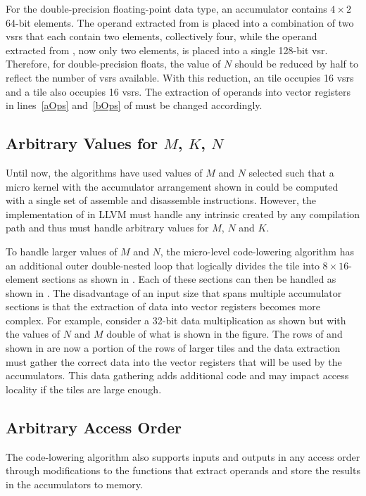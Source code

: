 \documentclass[\main/thesis.tex]{subfiles}
\begin{document}
For the double-precision floating-point data type, an accumulator contains $4 \times 2$ 64-bit elements.
The operand extracted from  is placed into a combination of two \glspl{vsr} that each contain two elements, collectively four, while the operand extracted from , now only two elements, is placed into a single 128-bit \gls{vsr}.
Therefore, for double-precision floats, the value of $N$ should be reduced by half to reflect the number of \glspl{vsr} available.
With this reduction, an  tile occupies 16 \glspl{vsr} and a  tile also occupies 16 \glspl{vsr}.
The extraction of operands into vector registers in lines~\ref{aOps} and~\ref{bOps} of  must be changed accordingly.

\subsection{Arbitrary Values for \texorpdfstring{$M$}{M}, \texorpdfstring{$K$}{K}, \texorpdfstring{$N$}{N}}
\label{sec:arbitraryDims}
Until now, the algorithms have used values of $M$ and $N$ selected such that a micro kernel with the accumulator arrangement shown in  could be computed with a single set of assemble and disassemble instructions.
However, the implementation of  in LLVM must handle any  intrinsic created by any compilation path and thus must handle arbitrary values for $M$, $N$ and $K$.

To handle larger values of $M$ and $N$, the micro-level code-lowering algorithm has an additional outer double-nested loop that logically divides the  tile into $8 \times 16$-element sections as shown in .
Each of these sections can then be handled as shown in .
The disadvantage of an input size that spans multiple accumulator sections is that the extraction of data into vector registers becomes more complex.
For example, consider a 32-bit data multiplication as shown  but with the values of $N$ and $M$ double of what is shown in the figure.
The rows of  and  shown in  are now a portion of the rows of larger tiles and the data extraction must gather the correct data into the vector registers that will be used by the accumulators.
This data gathering adds additional code and may impact access locality if the tiles are large enough.

\subsection{Arbitrary Access Order}
\label{sec:arbitraryOrder}
The code-lowering algorithm also supports inputs and outputs in any access order through modifications to the functions that extract operands and store the results in the accumulators to memory.
\end{document}
